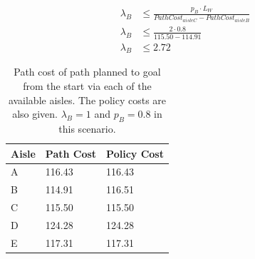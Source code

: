 \documentclass[a4paper,12pt]{article}
\begin{document}
		\begin{equation}
		\begin{split}
			\lambda_B &\leq \frac{p_B \cdot L_W}{PathCost_{aisleC} - PathCost_{aisleB}} \\
			\lambda_B &\leq \frac{2 \cdot 0.8}{115.50 - 114.91} \\
			\lambda_B &\leq 2.72
		\end{split}
		\label{eqn:thresholdLambdaAtStart}
		\end{equation}
		
		\begin{table}[H]
			\centering
			\begin{tabular}{@{}l|ll@{}}
				\toprule
				Aisle & Path Cost & Policy Cost \\ \midrule
				A     & 116.43          & 116.43            \\
				B     & 114.91          & 116.51            \\
				C     & 115.50          & 115.50            \\
				D     & 124.28          & 124.28            \\
				E     & 117.31          & 117.31            \\ \bottomrule
			\end{tabular}
			\caption{Path cost of path planned to goal from the start via each of the available aisles. The policy costs are also given. $\lambda_B=1$ and $p_B=0.8$ in this scenario.}
			\label{tab:pathAndPolicyCostSimulations}
		\end{table}
	
	
%	
%	
	
	
	
\end{document}
